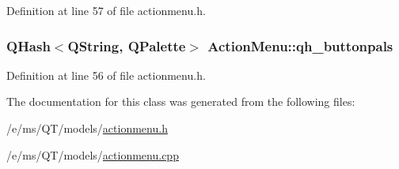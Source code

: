 Definition at line 57 of file actionmenu.h.

\hypertarget{classActionMenu_ab5d9ea9892dc558b8cc9fb1eafb60801}{
\subsubsection[{qh\_\-buttonpals}]{\setlength{\rightskip}{0pt plus 5cm}QHash$<$QString, QPalette$>$ {\bf ActionMenu::qh\_\-buttonpals}}}
\label{classActionMenu_ab5d9ea9892dc558b8cc9fb1eafb60801}


Definition at line 56 of file actionmenu.h.



The documentation for this class was generated from the following files:\begin{DoxyCompactItemize}
\item 
/e/ms/QT/models/\hyperlink{actionmenu_8h}{actionmenu.h}\item 
/e/ms/QT/models/\hyperlink{actionmenu_8cpp}{actionmenu.cpp}\end{DoxyCompactItemize}
